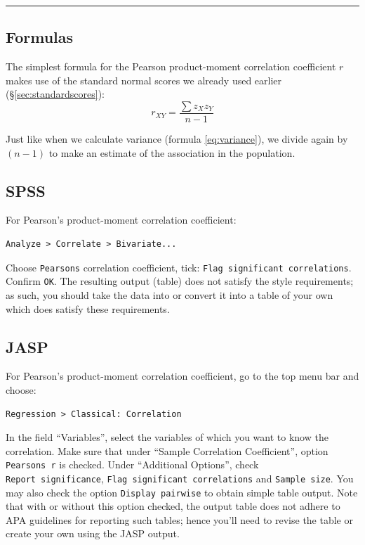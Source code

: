 \documentclass[
]{book}
\begin{document}
\begin{center}\rule{0.5\linewidth}{0.5pt}\end{center}

\subsection{Formulas}\label{formulas-3}

The simplest formula for the Pearson product-moment correlation coefficient
\(r\) makes use of the standard normal scores we already used earlier
(§\ref{sec:standardscores}):
\begin{equation}
    r_{XY} = \frac{\sum z_X z_Y}{n-1}
  \label{eq:pearson}
\end{equation}

Just like when we calculate variance
(formula \eqref{eq:variance}), we divide again by
\((n-1)\) to make an estimate of the association in the population.

\subsection{SPSS}\label{spss-5}

For Pearson's product-moment correlation coefficient:

\begin{verbatim}
Analyze > Correlate > Bivariate...
\end{verbatim}

Choose \texttt{Pearsons} correlation coefficient, tick:
\texttt{Flag\ significant\ correlations}. Confirm \texttt{OK}. The resulting
output (table) does not satisfy the style requirements; as such, you should
take the data into or convert it into a table of your own which does satisfy these requirements.

\subsection{JASP}\label{jasp-6}

For Pearson's product-moment correlation coefficient, go to the top menu bar and choose:

\begin{verbatim}
Regression > Classical: Correlation
\end{verbatim}

In the field ``Variables'', select the variables of which you want to know the correlation.
Make sure that under ``Sample Correlation Coefficient'', option \texttt{Pearson\textquotesingle{}s\ r} is checked.
Under ``Additional Options'', check \texttt{Report\ significance}, \texttt{Flag\ significant\ correlations} and \texttt{Sample\ size}. You may also check the option \texttt{Display\ pairwise} to obtain simple table output.
Note that with or without this option checked, the output table does not adhere to APA guidelines for reporting such tables; hence you'll need to revise the table or create your own using the JASP output.
\end{document}
